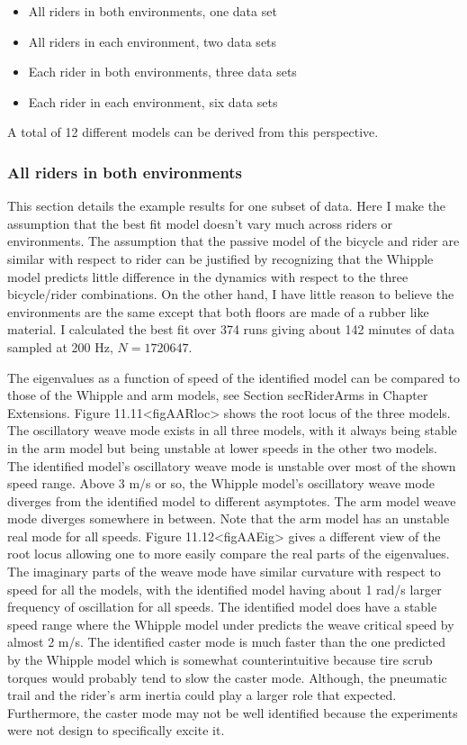 \documentclass[a4paper]{article}
\begin{document}
\begin{itemize}
  \item
    All riders in both environments, one data set
  \item
    All riders in each environment, two data sets
  \item
    Each rider in both environments, three data sets
  \item
    Each rider in each environment, six data sets
\end{itemize}

A total of 12 different models can be derived from this perspective.

\subsubsection{All riders in both environments}

This section details the example results for one subset of data. Here I
make the assumption that the best fit model doesn't vary much across
riders or environments. The assumption that the passive model of the
bicycle and rider are similar with respect to rider can be justified by
recognizing that the Whipple model predicts little difference in the
dynamics with respect to the three bicycle/rider combinations. On the
other hand, I have little reason to believe the environments are the
same except that both floors are made of a rubber like material. I
calculated the best fit over 374 runs giving about 142 minutes of data
sampled at 200 Hz, $N=1720647$.

The eigenvalues as a function of speed of the identified model can be
compared to those of the Whipple and arm models, see Section
secRiderArms in Chapter Extensions.
Figure 11.11\textless{}figAARloc\textgreater{} shows the root locus of
the three models. The oscillatory weave mode exists in all three models,
with it always being stable in the arm model but being unstable at lower
speeds in the other two models. The identified model's oscillatory weave
mode is unstable over most of the shown speed range. Above 3 m/s or so,
the Whipple model's oscillatory weave mode diverges from the identified
model to different asymptotes. The arm model weave mode diverges
somewhere in between. Note that the arm model has an unstable real mode
for all speeds. Figure
11.12\textless{}figAAEig\textgreater{} gives a different view of the
root locus allowing one to more easily compare the real parts of the
eigenvalues. The imaginary parts of the weave mode have similar
curvature with respect to speed for all the models, with the identified
model having about 1 rad/s larger frequency of oscillation for all
speeds. The identified model does have a stable speed range where the
Whipple model under predicts the weave critical speed by almost 2 m/s.
The identified caster mode is much faster than the one predicted by the
Whipple model which is somewhat counterintuitive because tire scrub
torques would probably tend to slow the caster mode. Although, the
pneumatic trail and the rider's arm inertia could play a larger role
that expected. Furthermore, the caster mode may not be well identified
because the experiments were not design to specifically excite it.
\end{document}
